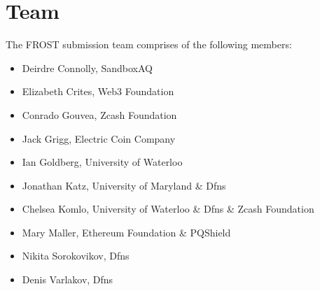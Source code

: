 \section{Team}

The FROST submission team comprises of the following members:

\begin{itemize}
\item Deirdre Connolly, SandboxAQ
\item Elizabeth Crites, Web3 Foundation
\item Conrado Gouvea, Zcash Foundation
\item Jack Grigg, Electric Coin Company
\item Ian Goldberg, University of Waterloo
\item Jonathan Katz, University of Maryland \& Dfns
\item Chelsea Komlo, University of Waterloo \& Dfns \& Zcash Foundation 
\item Mary Maller, Ethereum Foundation \& PQShield
\item Nikita Sorokovikov, Dfns
\item Denis Varlakov, Dfns
\end{itemize}
